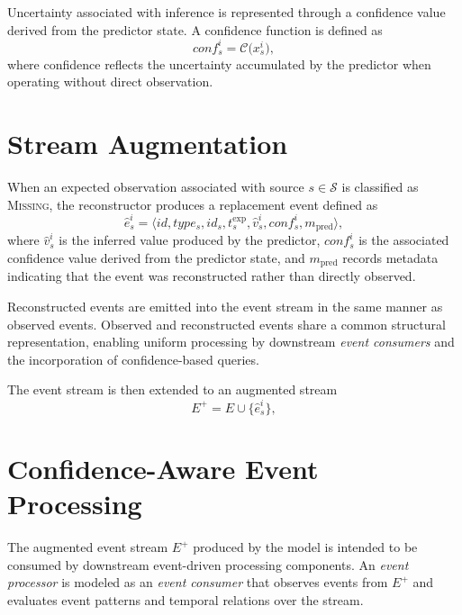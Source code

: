 Uncertainty associated with inference is represented through a confidence value derived from the predictor state. A confidence function is defined as
\begin{equation}
conf_s^{i} = \mathcal{C}\bigl(x_s^{i}\bigr),
\end{equation}
\noindent
where confidence reflects the uncertainty accumulated by the predictor when operating without direct observation.

\section{Stream Augmentation}
\label{sec:confidence-stream-augmentation}

When an expected observation associated with source $s \in \mathcal{S}$ is classified as \textsc{Missing}, the reconstructor produces a replacement event defined as
\begin{equation}
\hat{e}_s^{i} =
\langle id, type_s, id_s, t^{\mathrm{exp}}_s, \hat{v}_s^{i}, conf_s^{i}, m_{\mathrm{pred}} \rangle ,
\end{equation}
\noindent
where $\hat{v}_s^{i}$ is the inferred value produced by the predictor, $conf_s^{i}$ is the associated confidence value derived from the predictor state, and $m_{\mathrm{pred}}$ records metadata indicating that the event was reconstructed rather than directly observed.

Reconstructed events are emitted into the event stream in the same manner as observed events. Observed and reconstructed events share a common structural representation, enabling uniform processing by downstream \emph{event consumers} and the incorporation of confidence-based queries.

The event stream is then extended to an augmented stream
\begin{equation}
E^{+} = E \cup \{ \hat{e}_s^{i} \},
\end{equation}




\section{Confidence-Aware Event Processing}
\label{sec:confidence-aware-semantics}

The augmented event stream $E^{+}$ produced by the model is intended to be consumed by downstream event-driven processing components. An \emph{event processor} is modeled as an \emph{event consumer} that observes events from $E^{+}$ and evaluates event patterns and temporal relations over the stream.

